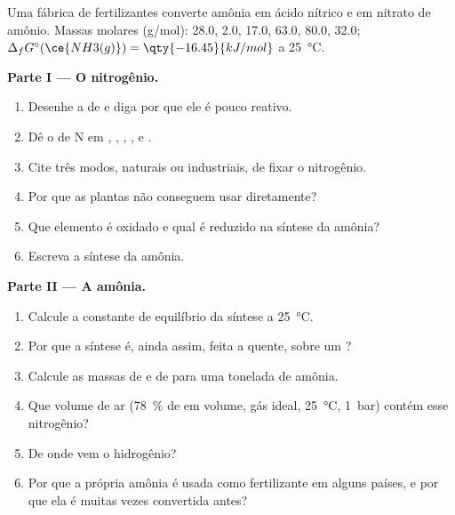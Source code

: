\begin{problem}
\label{pb:b1:p-block-13-15:1}
Uma fábrica de fertilizantes converte amônia em ácido nítrico e em
nitrato de amônio. Massas molares (\unit{g/mol}):  28.0,  2.0, 
17.0,  63.0,  80.0,  32.0;
$\Delta_f G^\circ(\ce{NH3(g)}) = \qty{-16.45}{kJ/mol}$ a
\qty{25}{\celsius}.

\medskip
\noindent\textbf{Parte I --- O nitrogênio.}
\begin{enumerate}
  \item Desenhe a  de  e diga por que ele é pouco reativo.
  \item Dê o  de N em , , ,
        ,  e .
  \item Cite três modos, naturais ou industriais, de fixar o nitrogênio.
  \item Por que as plantas não conseguem usar  diretamente?
  \item Que elemento é oxidado e qual é reduzido na síntese da
        amônia?
  \item Escreva a síntese da amônia.
\end{enumerate}

\medskip
\noindent\textbf{Parte II --- A amônia.}
\begin{enumerate}[resume]
  \item Calcule a constante de equilíbrio da síntese a
        \qty{25}{\celsius}.
  \item Por que a síntese é, ainda assim, feita a quente, sobre um ?
  \item Calcule as massas de  e de  para uma tonelada de
        amônia.
  \item Que volume de ar (\qty{78}{\percent} de  em volume, gás
        ideal, \qty{25}{\celsius}, \qty{1}{bar}) contém esse nitrogênio?
  \item De onde vem o hidrogênio?
  \item Por que a própria amônia é usada como fertilizante em alguns
        países, e por que ela é muitas vezes convertida antes?
\end{enumerate}


\end{problem}
